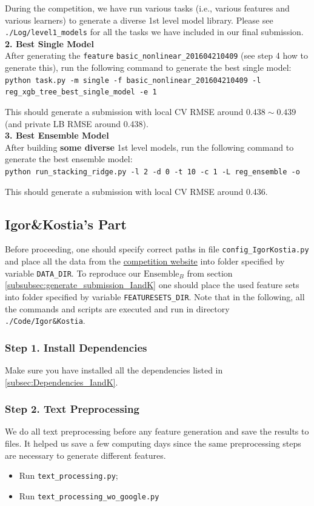 \documentclass[12pt]{article}
\begin{document}
{{\begin{appendices}
During the competition, we have run various tasks (i.e., various features and various learners) to generate a diverse 1st level model library. Please see \texttt{./Log/level1\_models} for all the tasks we have included in our final submission.\\
\textbf{2. Best Single Model}\\
After generating the \texttt{feature} \texttt{basic\_nonlinear\_201604210409} (see step 4 how to generate this), run the following command to generate the best single model:\\
\texttt{python task.py -m single -f basic\_nonlinear\_201604210409 -l reg\_xgb\_tree\_best\_single\_model -e 1}

This should generate a submission with local CV RMSE around $0.438\sim 0.439$ (and private LB RMSE around 0.438).\\
\textbf{3. Best Ensemble Model}\\
After building \textbf{some diverse} 1st level models, run the following command to generate the best ensemble model:\\
\texttt{python run\_stacking\_ridge.py -l 2 -d 0 -t 10 -c 1 -L reg\_ensemble -o}

This should generate a submission with local CV RMSE around 0.436.




\subsection{Igor\&Kostia's Part}
Before proceeding, one should specify correct paths in file \texttt{config\_IgorKostia.py} and place all the data from the \href{https://www.kaggle.com/c/home-depot-product-search-relevance/dat}{competition website} into folder specified by variable \texttt{DATA\_DIR}.  To reproduce our $\text{Ensemble}_B$   from section \ref{subsubsec:generate_submission_IandK}  one should place the used feature sets into folder specified by variable \texttt{FEATURESETS\_DIR}. Note that in the following, all the commands and scripts are executed and run in directory \texttt{./Code/Igor\&Kostia}.

\subsubsection{Step 1. Install Dependencies}
Make sure you have installed all the dependencies listed in \ref{subsec:Dependencies_IandK}.

\subsubsection{Step 2. Text Preprocessing}
We do all text preprocessing before any feature generation and save the results to files. It helped us save a few computing days since the same preprocessing steps are necessary to generate different features.
\begin{itemize}
\item Run \texttt{text\_processing.py};
\item Run  \texttt{text\_processing\_wo\_google.py}
\end{itemize}


\end{appendices}}}
\end{document}
